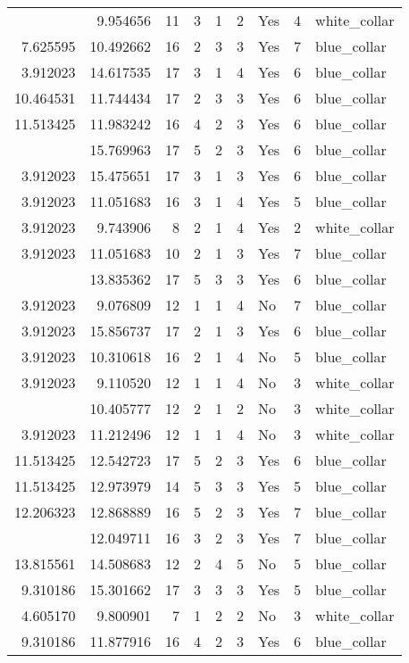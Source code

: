 \documentclass[
]{article}
\begin{document}
\begin{longtable}[t]{rrrrrllrl}
\addlinespace
3.912023 & 9.954656 & 11 & 3 & 1 & 2 & Yes & 4 & white\_collar\\
7.625595 & 10.492662 & 16 & 2 & 3 & 3 & Yes & 7 & blue\_collar\\
3.912023 & 14.617535 & 17 & 3 & 1 & 4 & Yes & 6 & blue\_collar\\
10.464531 & 11.744434 & 17 & 2 & 3 & 3 & Yes & 6 & blue\_collar\\
11.513425 & 11.983242 & 16 & 4 & 2 & 3 & Yes & 6 & blue\_collar\\
\addlinespace
14.508683 & 15.769963 & 17 & 5 & 2 & 3 & Yes & 6 & blue\_collar\\
3.912023 & 15.475651 & 17 & 3 & 1 & 3 & Yes & 6 & blue\_collar\\
3.912023 & 11.051683 & 16 & 3 & 1 & 4 & Yes & 5 & blue\_collar\\
3.912023 & 9.743906 & 8 & 2 & 1 & 4 & Yes & 2 & white\_collar\\
3.912023 & 11.051683 & 10 & 2 & 1 & 3 & Yes & 7 & blue\_collar\\
\addlinespace
10.167773 & 13.835362 & 17 & 5 & 3 & 3 & Yes & 6 & blue\_collar\\
3.912023 & 9.076809 & 12 & 1 & 1 & 4 & No & 7 & blue\_collar\\
3.912023 & 15.856737 & 17 & 2 & 1 & 3 & Yes & 6 & blue\_collar\\
3.912023 & 10.310618 & 16 & 2 & 1 & 4 & No & 5 & blue\_collar\\
3.912023 & 9.110520 & 12 & 1 & 1 & 4 & No & 3 & white\_collar\\
\addlinespace
3.912023 & 10.405777 & 12 & 2 & 1 & 2 & No & 3 & white\_collar\\
3.912023 & 11.212496 & 12 & 1 & 1 & 4 & No & 3 & white\_collar\\
11.513425 & 12.542723 & 17 & 5 & 2 & 3 & Yes & 6 & blue\_collar\\
11.513425 & 12.973979 & 14 & 5 & 3 & 3 & Yes & 5 & blue\_collar\\
12.206323 & 12.868889 & 16 & 5 & 2 & 3 & Yes & 7 & blue\_collar\\
\addlinespace
8.527143 & 12.049711 & 16 & 3 & 2 & 3 & Yes & 7 & blue\_collar\\
13.815561 & 14.508683 & 12 & 2 & 4 & 5 & No & 5 & blue\_collar\\
9.310186 & 15.301662 & 17 & 3 & 3 & 3 & Yes & 5 & blue\_collar\\
4.605170 & 9.800901 & 7 & 1 & 2 & 2 & No & 3 & white\_collar\\
9.310186 & 11.877916 & 16 & 4 & 2 & 3 & Yes & 6 & blue\_collar\\

\end{longtable}
\end{document}
